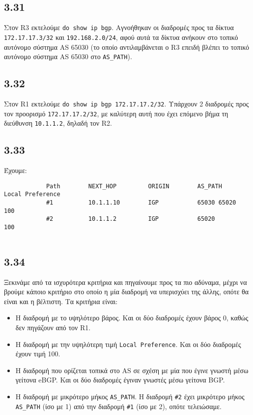 \documentclass[a4paper, 12pt]{article}
\begin{document}
	\subsection*{3.31}
		Στον R3 εκτελούμε \verb|do show ip bgp|. Αγνοήθηκαν οι διαδρομές προς τα δίκτυα \verb|172.17.17.3/32| και \verb|192.168.2.0/24|, αφού αυτά τα δίκτυα ανήκουν στο τοπικό αυτόνομο σύστημα AS 65030 (το οποίο αντιλαμβάνεται ο R3 επειδή βλέπει το τοπικό αυτόνομο σύστημα AS 65030 στο \verb|AS_PATH|).

	\subsection*{3.32}
		Στον R1 εκτελούμε \verb|do show ip bgp 172.17.17.2/32|. Υπάρχουν 2 διαδρομές προς τον προορισμό \verb|172.17.17.2/32|, με καλύτερη αυτή που έχει επόμενο βήμα τη διεύθυνση \verb|10.1.1.2|, δηλαδή τον R2. 

	\subsection*{3.33}
		Έχουμε:
		
		\begin{verbatim}
			Path        NEXT_HOP         ORIGIN        AS_PATH            Local Preference
			#1          10.1.1.10        IGP           65030 65020        100
			#2          10.1.1.2         IGP           65020              100
			
		\end{verbatim}

	\subsection*{3.34}
		Ξεκινάμε από τα ισχυρότερα κριτήρια και πηγαίνουμε προς τα πιο αδύναμα, μέχρι να βρούμε κάποιο κριτήριο στο οποίο η μία διαδρομή να υπερισχύει της άλλης, οπότε θα είναι και η βέλτιστη. Τα κριτήρια είναι:
		
		\begin{itemize}
			\item Η διαδρομή με το υψηλότερο βάρος. Και οι δύο διαδρομές έχουν βάρος 0, καθώς δεν πηγάζουν από τον R1.
			\item Η διαδρομή με την υψηλότερη τιμή \verb|Local Preference|. Και οι δύο διαδρομές έχουν τιμή 100.
			\item Η διαδρομή που ορίζεται τοπικά στο AS σε σχέση με μία που έγινε γνωστή μέσω γείτονα eBGP. Και οι δύο διαδρομές έγιναν γνωστές μέσω γείτονα BGP.
			\item Η διαδρομή με μικρότερο μήκος \verb|AS_PATH|. Η διαδρομή \verb|#2| έχει μικρότερο μήκος \verb|AS_PATH| (ίσο με 1) από την διαδρομή \verb|#1| (ίσο με 2), οπότε τελειώσαμε.
		\end{itemize}
\end{document}
